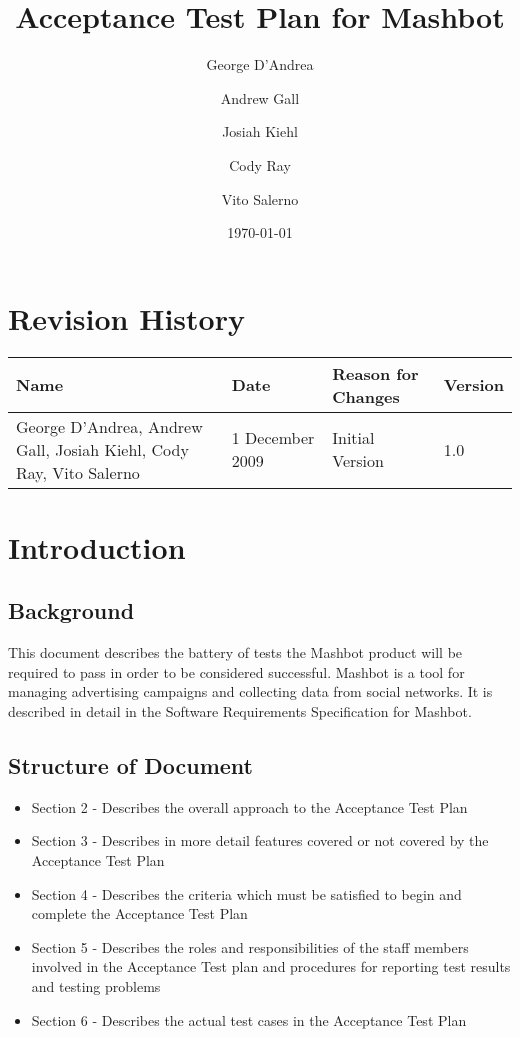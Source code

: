 \documentclass{article}
\begin{document}
\pagestyle{plain}
\title{Acceptance Test Plan for Mashbot} 
\author{George D'Andrea \and Andrew Gall \and Josiah Kiehl \and
  Cody Ray \and Vito Salerno}
\date{\today}
\begin{titlepage}
\maketitle
\end{titlepage}

\section*{Revision History}
\begin{tabular}{|p{2in}|l|l|l|}
  \hline
  \textbf{Name} & \textbf{Date} & \textbf{Reason for Changes} & \textbf{Version} \\
  \hline \hline
  George D'Andrea, Andrew Gall, Josiah Kiehl, Cody Ray, Vito
  Salerno & 1 December 2009 & Initial Version & 1.0 \\
  \hline
\end{tabular}

\clearpage
\tableofcontents
\clearpage

\section{Introduction} %

\subsection{Background}

This document describes the battery of tests the Mashbot product will
be required to pass in order to be considered successful. Mashbot is a
tool for managing advertising campaigns and collecting data from
social networks. It is described in detail in the Software
Requirements Specification for Mashbot.

\subsection{Structure of Document}
\begin{itemize}
  \item Section 2 - Describes the overall approach to the Acceptance
    Test Plan
  \item Section 3 - Describes in more detail features covered
    or not covered by the Acceptance Test Plan
  \item Section 4 - Describes the criteria which must be satisfied to
    begin and complete the Acceptance Test Plan
  \item Section 5 - Describes the roles and responsibilities of the
    staff members involved in the Acceptance Test plan and procedures for
    reporting test results and testing problems
  \item Section 6 - Describes the actual test cases in the Acceptance
    Test Plan
\end{itemize}
\end{document}
